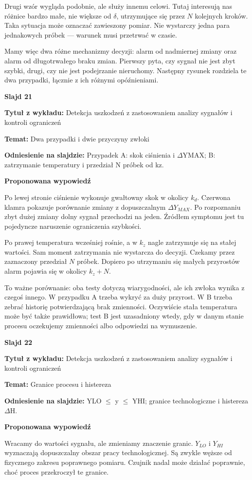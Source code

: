 \documentclass[a4paper,11pt]{article}
\newcommand{\NumerSlajdu}{1}
\newcommand{\Komentarz}[3]{%
  \gdef\NumerSlajdu{#1}%
  {\Large\bfseries Slajd #1\par}\smallskip
  \textbf{Tytuł z wykładu:} #2\par
  \textbf{Temat:} #3\par\medskip
}
\begin{document}
Drugi wzór wygląda podobnie, ale służy innemu celowi. Tutaj interesują nas różnice bardzo małe, nie większe od $\delta$, utrzymujące się przez $N$ kolejnych kroków. Taka sytuacja może oznaczać zawieszony pomiar. Nie wystarczy jedna para jednakowych próbek — warunek musi przetrwać w czasie.

Mamy więc dwa różne mechanizmy decyzji: alarm od nadmiernej zmiany oraz alarm od długotrwałego braku zmian. Pierwszy pyta, czy sygnał nie jest zbyt szybki, drugi, czy nie jest podejrzanie nieruchomy. Następny rysunek rozdziela te dwa przypadki, łącznie z ich różnymi opóźnieniami.
\clearpage

\Komentarz{21}{Detekcja uszkodzeń z zastosowaniem analizy sygnałów i kontroli ograniczeń}{Dwa przypadki i dwie przyczyny zwłoki}
{\small\color{black!65}\textbf{Odniesienie na slajdzie:} Przypadek A: skok ciśnienia i \ensuremath{\Delta}YMAX; B: zatrzymanie temperatury i przedział N próbek od kz.\par}
\medskip
\textbf{Proponowana wypowiedź}\par
Po lewej stronie ciśnienie wykonuje gwałtowny skok w okolicy $k_d$. Czerwona klamra pokazuje porównanie zmiany z dopuszczalnym $\Delta Y_{MAX}$. Po rozpoznaniu zbyt dużej zmiany dolny sygnał przechodzi na jeden. Źródłem symptomu jest tu pojedyncze naruszenie ograniczenia szybkości.

Po prawej temperatura wcześniej rośnie, a w $k_z$ nagle zatrzymuje się na stałej wartości. Sam moment zatrzymania nie wystarcza do decyzji. Czekamy przez zaznaczony przedział $N$ próbek. Dopiero po utrzymaniu się małych przyrostów alarm pojawia się w okolicy $k_z+N$.

To ważne porównanie: oba testy dotyczą wiarygodności, ale ich zwłoka wynika z czegoś innego. W przypadku A trzeba wykryć za duży przyrost. W B trzeba zebrać historię potwierdzającą brak zmienności. Oczywiście stała temperatura może być także prawidłowa; test B jest uzasadniony wtedy, gdy w danym stanie procesu oczekujemy zmienności albo odpowiedzi na wymuszenie.
\clearpage

\Komentarz{22}{Detekcja uszkodzeń z zastosowaniem analizy sygnałów i kontroli ograniczeń}{Granice procesu i histereza}
{\small\color{black!65}\textbf{Odniesienie na slajdzie:} YLO \ensuremath{\leq} y \ensuremath{\leq} YHI; granice technologiczne i histereza \ensuremath{\Delta}H.\par}
\medskip
\textbf{Proponowana wypowiedź}\par
Wracamy do wartości sygnału, ale zmieniamy znaczenie granic. $Y_{LO}$ i $Y_{HI}$ wyznaczają dopuszczalny obszar pracy technologicznej. Są zwykle węższe od fizycznego zakresu poprawnego pomiaru. Czujnik nadal może działać poprawnie, choć proces przekroczył te granice.
\end{document}
